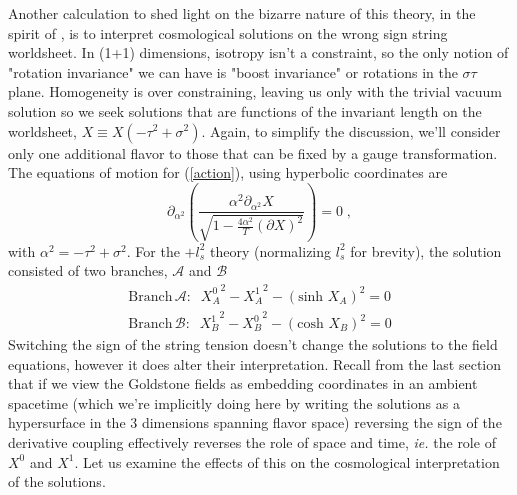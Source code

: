 \documentclass[%
 reprint,
 amsmath,amssymb,
 aps,
]{revtex4-1}
\begin{document}
Another calculation to shed light on the bizarre nature of this theory, in the spirit of
\cite{Dubovsky:2012wk}, is to interpret cosmological solutions on the wrong sign string worldsheet.
In (1+1) dimensions, isotropy isn't a constraint, so the only notion of "rotation invariance" we can
have is "boost invariance" or rotations in the $\sigma\tau$ plane.  Homogeneity is over
constraining, leaving us only with the trivial vacuum solution so we seek solutions that are
functions of the invariant length on the worldsheet, $X \equiv X(-\tau^2 + \sigma^2)$.  Again, to
simplify the discussion, we'll consider only one additional flavor to those that can be fixed by a
gauge transformation. The equations of motion for (\ref{action}), using hyperbolic coordinates are
\begin{equation}
    \partial_{\alpha^2} \left( \frac{\alpha^2 \partial_{\alpha^2} X}{\sqrt{1 -
    \frac{4\alpha^2}{T}(\partial X)^2}} \right) = 0 \nonumber \; ,
\end{equation}
with $\alpha^2 = -\tau^2 + \sigma^2$.  For the $+l_{s}^{2}$ theory (normalizing $l_s^2$ for brevity), the
solution consisted of two branches,
$\mathcal{A}$ and $\mathcal{B}$
\begin{align}
    \mathrm{Branch} \, \mathcal{A}: \; \; \left . X^{0}_A \right . ^{2} -\left . X^{1}_A \right . ^{2} -
    (\text{sinh } X_A)^{2}=0 \nonumber \\
    \mathrm{Branch} \, \mathcal{B}: \; \; \left . X^{1}_B \right . ^{2} -\left . X^{0}_B \right . ^{2} -
    (\text{cosh } X_B)^{2}=0 \nonumber
\end{align}
Switching the sign of the string tension doesn't change the solutions to the field equations,
however it does alter their interpretation.  Recall from the last section that if we view the Goldstone
fields as embedding coordinates in an ambient spacetime (which we're implicitly doing here by
writing the solutions as a hypersurface in the 3 dimensions spanning flavor space) reversing the
sign of the derivative coupling effectively reverses the role of space and time, \emph{ie.} the role
of $X^0$ and $X^1$. Let us examine the effects of this on the cosmological interpretation of
the solutions.
\end{document}
